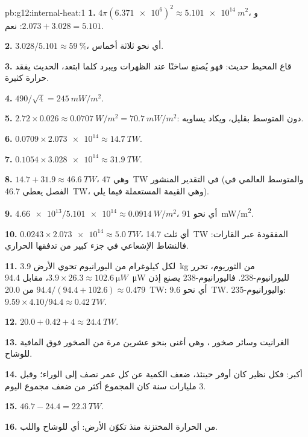 \begin{solution}{pb:g12:internal-heat:1}
\textbf{1.} $4\pi (\num{6.371e6})^2 \approx \qty{5.101e14}{m^2}$،
و$2.073 + 3.028 = 5.101$: نعم.

\textbf{2.} $3.028/5.101 \approx \qty{59}{\percent}$، أي نحو ثلاثة أخماس.

\textbf{3.} قاع المحيط حديث: فهو يُصنع ساخنًا عند الظهرات
ويبرد كلما ابتعد،  الحديث يفقد حرارة كثيرة.

\textbf{4.} $490/\sqrt{4} = \qty{245}{mW/m^2}$.

\textbf{5.} $2.72 \times 0.026 \approx \qty{0.0707}{W/m^2} =
\qty{70.7}{mW/m^2}$: دون المتوسط بقليل، ويكاد يساويه.

\textbf{6.} $0.0709 \times \num{2.073e14} \approx \qty{14.7}{TW}$.

\textbf{7.} $0.1054 \times \num{3.028e14} \approx \qty{31.9}{TW}$.

\textbf{8.} $14.7 + 31.9 \approx \qty{46.6}{TW}$، وهي \qty{47}{TW} في
التقدير المنشور (والمتوسط العالمي في الفصل يعطي \qty{46.7}{TW}، وهي
القيمة المستعملة فيما يلي).

\textbf{9.} $\num{4.66e13}/\num{5.101e14} \approx \qty{0.0914}{W/m^2}$،
أي نحو \qty{91}{mW/m^2}.

\textbf{10.} $0.0243 \times \num{2.073e14} \approx \qty{5.0}{TW}$، أي ثلث
\qty{14.7}{TW} المفقودة عبر القارات: فالنشاط الإشعاعي في
 جزء كبير من تدفقها الحراري.

\textbf{11.} لكل كيلوغرام من اليورانيوم تحوي الأرض \qty{3.9}{kg} من
الثوريوم، تحرر $3.9 \times 26.3 \approx \qty{102.6}{\micro W}$،
مقابل \qty{94.4}{\micro W} لليورانيوم-238. فاليورانيوم-238 يصنع إذن
$94.4/(94.4 + 102.6) \approx 0.479$ من \qty{20.0}{TW}: أي نحو
\qty{9.6}{TW}. واليورانيوم-235: $9.59 \times 4.10/94.4 \approx \qty{0.42}{TW}$.

\textbf{12.} $20.0 + 0.42 + 4 \approx \qty{24.4}{TW}$.

\textbf{13.} الغرانيت وسائر صخور ، وهي أغنى بنحو
عشرين مرة من الصخور فوق المافية للوشاح.

\textbf{14.} أكبر: فكل نظير كان أوفر حينئذ، ضعف الكمية عن
كل عمر نصف إلى الوراء؛ وقبل 3 مليارات سنة كان المجموع أكثر من ضعف
مجموع اليوم.

\textbf{15.} $46.7 - 24.4 = \qty{22.3}{TW}$.

\textbf{16.} من الحرارة المختزنة منذ تكوّن الأرض: أي  للوشاح واللب.


\end{solution}
